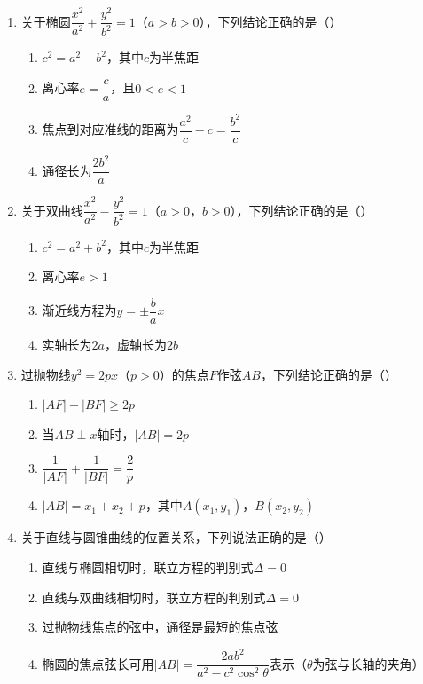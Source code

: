 \documentclass[12pt, a4paper]{ctexart}
\begin{document}
\begin{enumerate}[label=\arabic*.]

\item 关于椭圆$\dfrac{x^2}{a^2}+\dfrac{y^2}{b^2}=1$（$a>b>0$），下列结论正确的是（\quad）
\begin{enumerate}[label=]
\item $c^2=a^2-b^2$，其中$c$为半焦距
\item 离心率$e=\dfrac{c}{a}$，且$0<e<1$
\item 焦点到对应准线的距离为$\dfrac{a^2}{c}-c=\dfrac{b^2}{c}$
\item 通径长为$\dfrac{2b^2}{a}$
\end{enumerate}

\item 关于双曲线$\dfrac{x^2}{a^2}-\dfrac{y^2}{b^2}=1$（$a>0$，$b>0$），下列结论正确的是（\quad）
\begin{enumerate}[label=]
\item $c^2=a^2+b^2$，其中$c$为半焦距
\item 离心率$e>1$
\item 渐近线方程为$y=\pm\dfrac{b}{a}x$
\item 实轴长为$2a$，虚轴长为$2b$
\end{enumerate}

\item 过抛物线$y^2=2px$（$p>0$）的焦点$F$作弦$AB$，下列结论正确的是（\quad）
\begin{enumerate}[label=]
\item $|AF|+|BF|\geq 2p$
\item 当$AB\perp x$轴时，$|AB|=2p$
\item $\dfrac{1}{|AF|}+\dfrac{1}{|BF|}=\dfrac{2}{p}$
\item $|AB|=x_1+x_2+p$，其中$A(x_1,y_1)$，$B(x_2,y_2)$
\end{enumerate}

\item 关于直线与圆锥曲线的位置关系，下列说法正确的是（\quad）
\begin{enumerate}[label=]
\item 直线与椭圆相切时，联立方程的判别式$\Delta=0$
\item 直线与双曲线相切时，联立方程的判别式$\Delta=0$
\item 过抛物线焦点的弦中，通径是最短的焦点弦
\item 椭圆的焦点弦长可用$|AB|=\dfrac{2ab^2}{a^2-c^2\cos^2\theta}$表示（$\theta$为弦与长轴的夹角）
\end{enumerate}

\end{enumerate}
\end{document}
